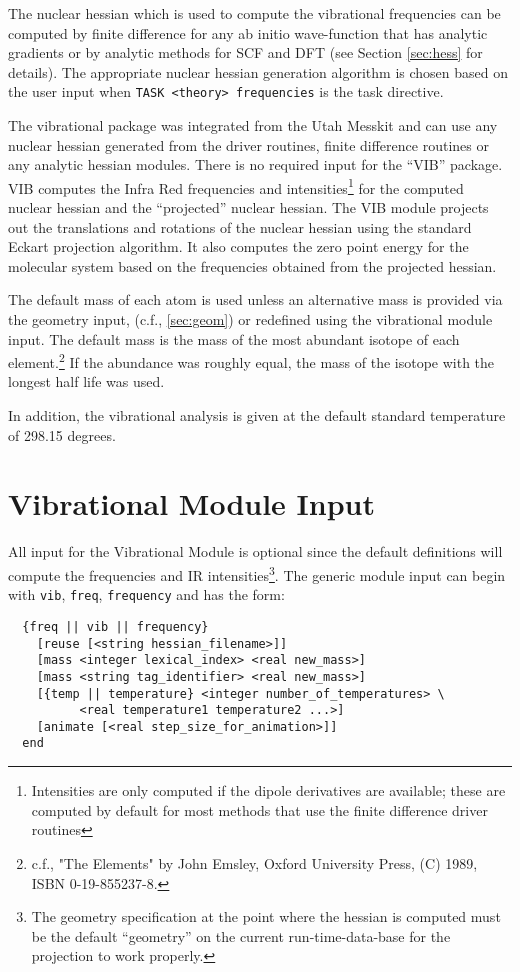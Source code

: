 \label{sec:vib}

The nuclear hessian which is used to compute the vibrational
frequencies can be computed by finite difference for any ab initio
wave-function that has analytic gradients or by analytic methods
for SCF and DFT (see Section \ref{sec:hess} for details).  The appropriate
nuclear hessian generation algorithm is chosen based on the user input
when \verb+TASK <theory> frequencies+ is the task directive.

The vibrational package was integrated from the Utah Messkit and can
use any nuclear hessian generated from the driver routines, finite
difference routines or any analytic hessian modules.  There is no required
input for the ``VIB'' package.  VIB computes the Infra Red frequencies
and intensities\footnote{Intensities are only computed if the dipole
derivatives are available; these are computed by default for most
methods that use the finite difference driver routines} for the
computed nuclear hessian and the ``projected'' nuclear hessian.  The
VIB module projects out the translations and rotations of the nuclear
hessian using the standard Eckart projection algorithm.  
It also computes the zero point energy for the molecular system
based on the frequencies obtained from the projected hessian.

The default mass of each atom is used unless an alternative mass is
provided via the geometry input, (c.f., \ref{sec:geom}) or redefined
using the vibrational module input.  The default mass is the mass of
the most abundant isotope of each element.\footnote{c.f., "The
Elements" by John Emsley, Oxford University Press, (C) 1989, ISBN
0-19-855237-8.} If the abundance was roughly equal, the mass of the
isotope with the longest half life was used.

In addition, the vibrational analysis is given at the default standard
temperature of 298.15 degrees.

\section{Vibrational Module Input}

All input for the Vibrational Module is optional since the default
definitions will compute the frequencies and IR
intensities\footnote{The geometry specification at the point where the
hessian is computed must be the default ``geometry'' on the current
run-time-data-base for the projection to work properly.}.  The generic
module input can begin with \verb+vib+, \verb+freq+, \verb+frequency+
and has the form:
\begin{verbatim}
  {freq || vib || frequency}
    [reuse [<string hessian_filename>]]
    [mass <integer lexical_index> <real new_mass>]
    [mass <string tag_identifier> <real new_mass>]
    [{temp || temperature} <integer number_of_temperatures> \
          <real temperature1 temperature2 ...>]
    [animate [<real step_size_for_animation>]]
  end
\end{verbatim}

